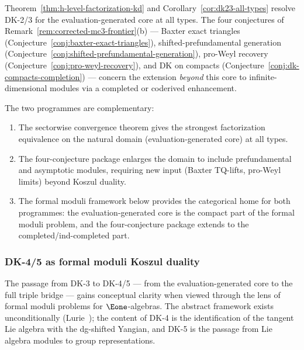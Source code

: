 \begin{remark}
\label{rem:h-level-vs-four-conjectures}
Theorem~\ref{thm:h-level-factorization-kd} and
Corollary~\ref{cor:dk23-all-types} resolve DK-2/3 for the
evaluation-generated core at all types.  The four conjectures of
Remark~\ref{rem:corrected-mc3-frontier}(b) ---
Baxter exact triangles
(Conjecture~\ref{conj:baxter-exact-triangles}),
shifted-prefundamental generation
(Conjecture~\ref{conj:shifted-prefundamental-generation}),
pro-Weyl recovery (Conjecture~\ref{conj:pro-weyl-recovery}), and
DK on compacts
(Conjecture~\ref{conj:dk-compacts-completion}) ---
concern the extension \emph{beyond} this core to
infinite-dimensional modules via a completed or coderived
enhancement.

The two programmes are complementary:
\begin{enumerate}[label=\textup{(\alph*)}]
\item The sectorwise convergence theorem gives the strongest
  factorization equivalence on the natural domain
  (evaluation-generated core) at all types.
\item The four-conjecture package enlarges the domain to include
  prefundamental and asymptotic modules, requiring new input
  (Baxter TQ-lifts, pro-Weyl limits) beyond Koszul duality.
\item The formal moduli framework below provides the categorical
  home for both programmes: the evaluation-generated core is the
  compact part of the formal moduli problem, and the four-conjecture
  package extends to the completed/ind-completed part.
\end{enumerate}
\end{remark}

\subsubsection*{DK-4/5 as formal moduli Koszul duality}

The passage from DK-3 to DK-4/5 --- from the evaluation-generated
core to the full triple bridge --- gains conceptual clarity when
viewed through the lens of formal moduli problems for
$\Eone$-algebras.  The abstract framework exists
unconditionally (Lurie~\cite{LurieDAGX}); the content of DK-4 is
the identification of the tangent Lie algebra with the dg-shifted
Yangian, and DK-5 is the passage from Lie algebra modules to group
representations.

